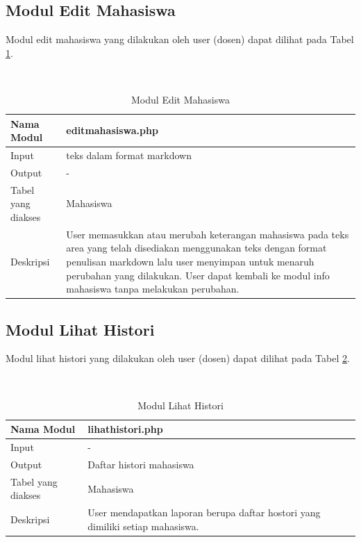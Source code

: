 \subsection{Modul Edit Mahasiswa}
Modul edit mahasiswa yang dilakukan oleh user (dosen) dapat dilihat pada Tabel \ref{tab:moduleditmahasiswa}.

\begin{center}
\begin{table}
\caption[Tabel 4-4 Modul Edit Mahasiswa]{Modul Edit Mahasiswa}\\
\label{tab:moduleditmahasiswa}
\begin{center}
\begin{tabular}{ l p{10cm} }
\hline
Nama Modul & editmahasiswa.php\\
\hline
Input & teks dalam format markdown\\
\hline
Output & -\\
\hline
Tabel yang diakses & Mahasiswa\\
\hline
Deskripsi & User memasukkan atau merubah keterangan mahasiswa pada teks area yang telah disediakan menggunakan teks dengan format penulisan markdown lalu user menyimpan untuk menaruh perubahan yang dilakukan. User dapat kembali ke modul info mahasiswa tanpa melakukan perubahan.\\
\hline
\end{tabular}
\end{center}
\end{table}
\end{center}

\subsection{Modul Lihat Histori}
Modul lihat histori yang dilakukan oleh user (dosen) dapat dilihat pada Tabel \ref{tab:modullihathistori}.

\begin{center}
\begin{table}
\caption[Tabel 4-5 Modul Lihat Histori]{Modul Lihat Histori}\\
\label{tab:modullihathistori}
\begin{center}
\begin{tabular}{ l p{10cm} }
\hline
Nama Modul & lihathistori.php\\
\hline
Input & -\\
\hline
Output & Daftar histori mahasiswa\\
\hline
Tabel yang diakses & Mahasiswa\\
\hline
Deskripsi & User mendapatkan laporan berupa daftar hostori yang dimiliki setiap mahasiswa.\\
\hline
\end{tabular}
\end{center}
\end{table}
\end{center}

